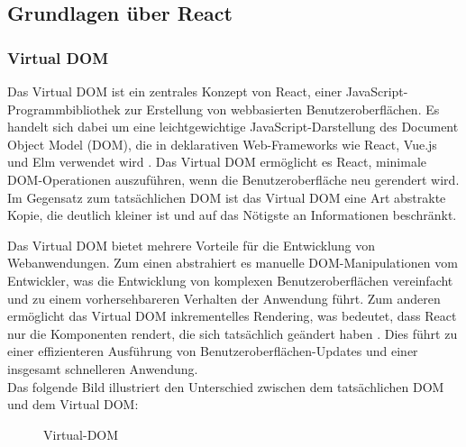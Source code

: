 \subsection{Grundlagen über React}
\subsubsection{Virtual DOM}
Das Virtual DOM ist ein zentrales Konzept von React, einer JavaScript-Programmbibliothek zur Erstellung von webbasierten Benutzeroberflächen\cite{ReactWikipedia}. Es handelt sich dabei um eine leichtgewichtige JavaScript-Darstellung des Document Object Model (DOM), die in deklarativen Web-Frameworks wie React, Vue.js und Elm verwendet wird \cite{VueJsAdesso}. Das Virtual DOM ermöglicht es React, minimale DOM-Operationen auszuführen, wenn die Benutzeroberfläche neu gerendert wird. Im Gegensatz zum tatsächlichen DOM ist das Virtual DOM eine Art abstrakte Kopie, die deutlich kleiner ist und auf das Nötigste an Informationen beschränkt.\cite{ReactWikipedia}

Das Virtual DOM bietet mehrere Vorteile für die Entwicklung von Webanwendungen. Zum einen abstrahiert es manuelle DOM-Manipulationen vom Entwickler, was die Entwicklung von komplexen Benutzeroberflächen vereinfacht und zu einem vorhersehbareren Verhalten der Anwendung führt. Zum anderen ermöglicht das Virtual DOM inkrementelles Rendering, was bedeutet, dass React nur die Komponenten rendert, die sich tatsächlich geändert haben \cite{ReactWikipedia}. Dies führt zu einer effizienteren Ausführung von Benutzeroberflächen-Updates und einer insgesamt schnelleren Anwendung.\\
Das folgende Bild illustriert den Unterschied zwischen dem tatsächlichen DOM und dem Virtual DOM:


\begin{figure}[htbp]
	\centering
	\caption{Virtual-DOM}
\end{figure}

